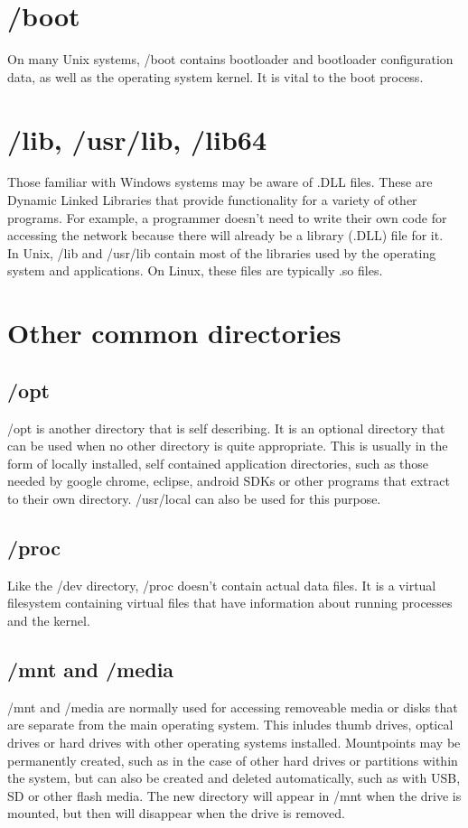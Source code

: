 \section{/boot}

On many Unix systems, /boot contains bootloader and bootloader configuration data, as well as the operating system kernel.  It is vital to the boot process.

\section{/lib, /usr/lib, /lib64}

Those familiar with Windows systems may be aware of .DLL files.  These are Dynamic Linked Libraries that provide functionality for a variety of other programs.  For example, a programmer doesn't need to write their own code for accessing the network because there will already be a library (.DLL) file for it.\\

In Unix, /lib and /usr/lib contain most of the libraries used by the operating system and applications.  On Linux, these files are typically .so files.

\section{Other common directories}

\subsection{/opt}

/opt is another directory that is self describing.  It is an optional directory that can be used when no other directory is quite appropriate.  This is usually in the form of locally installed, self contained application directories, such as those needed by google chrome, eclipse, android SDKs or other programs that extract to their own directory.  /usr/local can also be used for this purpose.

\subsection{/proc}

Like the /dev directory, /proc doesn't contain actual data files.  It is a virtual filesystem containing virtual files that have information about running processes and the kernel.

\subsection{/mnt and /media}

/mnt and /media are normally used for accessing removeable media or disks that are separate from the main operating system.  This inludes thumb drives, optical drives or hard drives with other operating systems installed.  Mountpoints may be permanently created, such as in the case of other hard drives or partitions within the system, but can also be created and deleted automatically, such as with USB, SD or other flash media.  The new directory will appear in /mnt when the drive is mounted, but then will disappear when the drive is removed.
